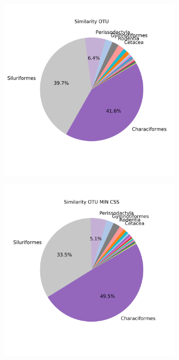 \begin{figure}[h]
\begin{subfigure}{0.45\textwidth}
		\caption{}
		\label{fig:simotumincssmean}
	\end{subfigure}\\
	\begin{subfigure}{0.45\textwidth}
		\includegraphics[width=\textwidth]{rfr_sim_sum_pieOTU}
		\caption{}
		\label{fig:simotusum}
	\end{subfigure}
	\begin{subfigure}{0.45\textwidth}
		\includegraphics[width=\textwidth]{rfr_sim_sum_pieOTU MIN CSS}

\end{subfigure}
\end{figure}
